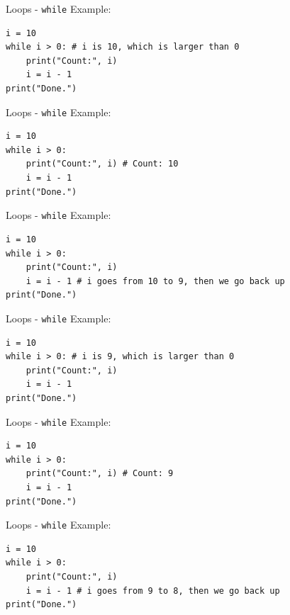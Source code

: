 \documentclass[dvipsnames, svgnames, x11names]{beamer}
\begin{document}
\addtocounter{framenumber}{-1}

\begin{frame}[fragile]{Loops - \texttt{while}}
Example:
\begin{verbatim}
i = 10
while i > 0: # i is 10, which is larger than 0
    print("Count:", i)
    i = i - 1
print("Done.")
\end{verbatim}
\end{frame}

\addtocounter{framenumber}{-1}

\begin{frame}[fragile]{Loops - \texttt{while}}
Example:
\begin{verbatim}
i = 10
while i > 0: 
    print("Count:", i) # Count: 10
    i = i - 1
print("Done.")
\end{verbatim}
\end{frame}

\addtocounter{framenumber}{-1}

\begin{frame}[fragile]{Loops - \texttt{while}}
Example:
\begin{verbatim}
i = 10
while i > 0: 
    print("Count:", i)
    i = i - 1 # i goes from 10 to 9, then we go back up
print("Done.")
\end{verbatim}
\end{frame}

\addtocounter{framenumber}{-1}

\begin{frame}[fragile]{Loops - \texttt{while}}
Example:
\begin{verbatim}
i = 10
while i > 0: # i is 9, which is larger than 0
    print("Count:", i)
    i = i - 1
print("Done.")
\end{verbatim}
\end{frame}

\addtocounter{framenumber}{-1}

\begin{frame}[fragile]{Loops - \texttt{while}}
Example:
\begin{verbatim}
i = 10
while i > 0: 
    print("Count:", i) # Count: 9
    i = i - 1
print("Done.")
\end{verbatim}
\end{frame}

\addtocounter{framenumber}{-1}

\begin{frame}[fragile]{Loops - \texttt{while}}
Example:
\begin{verbatim}
i = 10
while i > 0: 
    print("Count:", i)
    i = i - 1 # i goes from 9 to 8, then we go back up
print("Done.")
\end{verbatim}
\end{frame}
\end{document}
